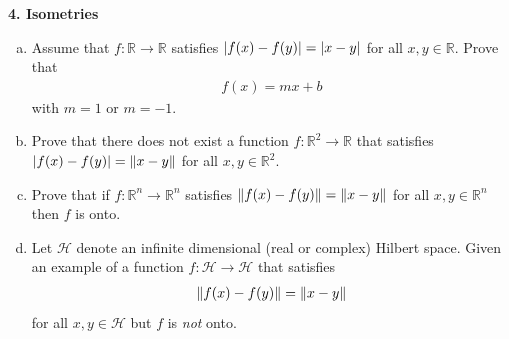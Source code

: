 \documentclass[11pt]{article}
\begin{document}
\newpage








\noindent \textbf{4. Isometries}

\begin{enumerate}[(a)]
	\item Assume that $f: \mathbb{R} \to \mathbb{R}$ satisfies $\abs{f(x) - f(y)} = \abs{x-y}$ for all $x,y\in \mathbb{R}$. Prove that 
	\begin{align*}
	f(x) = mx+b
	\end{align*}
	with $m=1$ or $m=-1$.
	
	\item Prove that there does not exist a function $f: \mathbb{R}^2 \to \mathbb{R}$ that satisfies $\abs{f(x) - f(y)} = \norm{x-y}$ for all $x,y\in \mathbb{R}^2$.
	
	
	\item Prove that if $f: \mathbb{R}^n \to \mathbb{R}^n$ satisfies $\norm{f(x) - f(y)} = \norm{x-y}$ for all $x,y\in \mathbb{R}^n$ then $f$ is onto.
	
	
	
	
	\item Let $\mathcal{H}$ denote an infinite dimensional (real or complex) Hilbert space. Given an example of a function $f: \mathcal{H} \to \mathcal{H}$ that satisfies 
	\begin{align*}
	\norm{f(x) - f(y)} = \norm{x-y}
	\end{align*} 
	for all $x,y\in \mathcal{H}$ but $f$ is \textit{not} onto. 
\end{enumerate}
\end{document}
